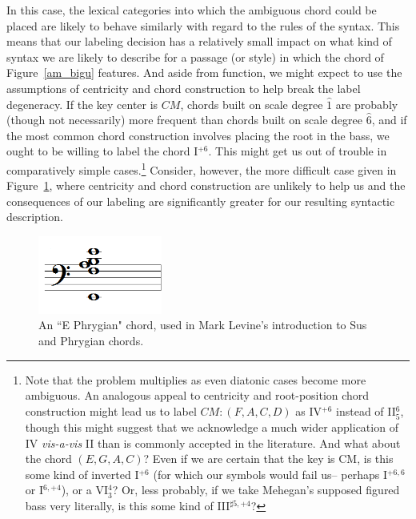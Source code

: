In this case, the lexical categories into which the ambiguous chord could be placed are likely to behave similarly with regard to the rules of the syntax.  This means that our labeling decision has a relatively small impact on what kind of syntax we are likely to describe for a passage (or style) in which the chord of Figure~\ref{am_bigu} features.  And aside from function, we might expect to use the assumptions of centricity and chord construction to help break the label degeneracy.  If the key center is $CM$, chords built on scale degree $\hat{1}$ are probably (though not necessarily) more frequent than chords built on scale degree $\hat{6}$, and if the most common chord construction involves placing the root in the bass, we ought to be willing to label the chord I$^{+6}$.  This might get us out of trouble in comparatively simple cases.\footnote{Note that the problem multiplies as even diatonic cases become more ambiguous.  An analogous appeal to centricity and root-position chord construction might lead us to label $CM: (F,A,C,D)$ as IV$^{+6}$ instead of II$^{6}_5$, though this might suggest that we acknowledge a much wider application of IV \emph{vis-a-vis} II than is commonly accepted in the literature. And what about the chord $(E,G,A,C)$?  Even if we are certain that the key is CM, is this some kind of inverted I$^{+6}$ (for which our symbols would fail us-- perhaps I$^{+6,6}$ or I$^{6,+4}$), or a VI$^{4}_3$?  Or, less probably, if we take Mehegan's supposed figured bass very literally, is this some kind of III$^{\sharp 5, +4}$?}  Consider, however, the more difficult case given in Figure~\ref{phry}, where centricity and chord construction are unlikely to help us and the consequences of our labeling are significantly greater for our resulting syntactic description.
\begin{figure}
	\centering
	\caption{An ``E Phrygian" chord, used in Mark Levine's introduction to Sus and Phrygian chords.}
	\label{phry}
	\includegraphics[width=1.6in]{diss_prospectus_ephryg.png}
\end{figure}

